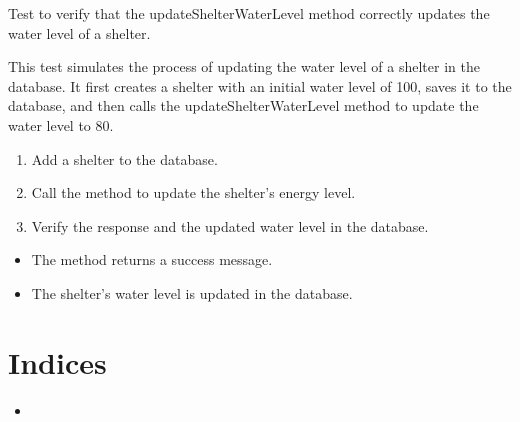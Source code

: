 \documentclass[letterpaper,10pt,english]{sphinxmanual}
\begin{document}
\begin{fulllineitems}
\label{\detokenize{test:test.test_shelter.test_updateShelterWaterLevel_success}}
\pysigstartsignatures
\pysiglinewithargsret
{}
{\sphinxparamcomma {}}
{}
\pysigstopsignatures
\sphinxAtStartPar
Test to verify that the updateShelterWaterLevel method correctly updates the water level of a shelter.

\sphinxAtStartPar
This test simulates the process of updating the water level of a shelter in the database.
It first creates a shelter with an initial water level of 100, saves it to the database, and then
calls the updateShelterWaterLevel method to update the water level to 80.
\begin{description}
\begin{enumerate}
%
\item {} 
\sphinxAtStartPar
Add a shelter to the database.

\item {} 
\sphinxAtStartPar
Call the  method to update the shelter’s energy level.

\item {} 
\sphinxAtStartPar
Verify the response and the updated water level in the database.

\end{enumerate}

\begin{itemize}
\item {} 
\sphinxAtStartPar
The method returns a success message.

\item {} 
\sphinxAtStartPar
The shelter’s water level is updated in the database.

\end{itemize}

\end{description}

\end{fulllineitems}



\chapter{Indices}
\label{\detokenize{index:indices}}\begin{itemize}
\item {} 
\sphinxAtStartPar
{}

\end{itemize}
\end{document}
